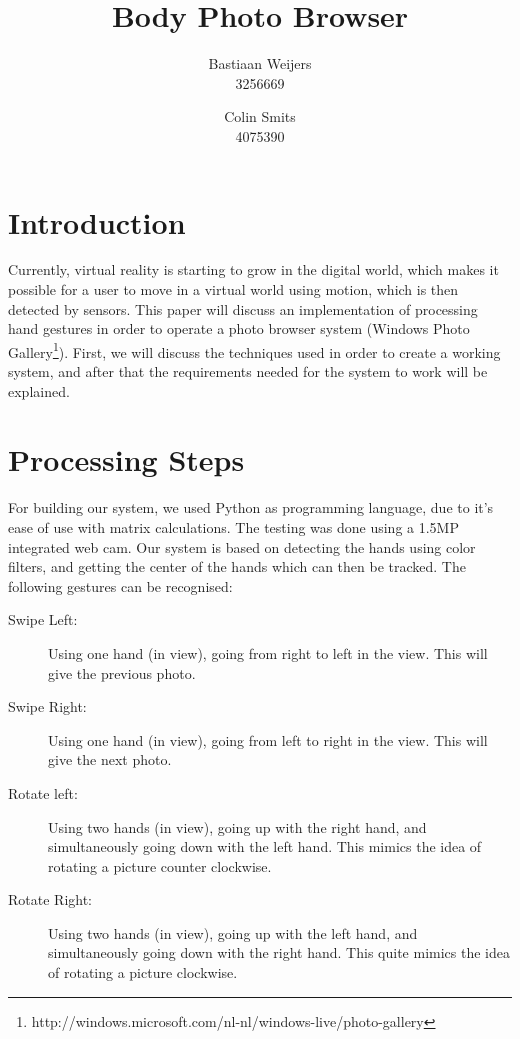 \documentclass[11pt,a4paper]{article}
\author{Bastiaan Weijers \\ 3256669 \and Colin Smits \\4075390}
\title{Body Photo Browser}
\begin{document}
\maketitle


\section{Introduction}
Currently, virtual reality is starting to grow in the digital world, which makes it possible for a user to move in a virtual world using motion, which is then detected by sensors. This paper will discuss an implementation of processing hand gestures in order to operate a photo browser system (Windows Photo Gallery\footnote{http://windows.microsoft.com/nl-nl/windows-live/photo-gallery}). First, we will discuss the techniques used in order to create a working system, and after that the requirements needed for the system to work will be explained.

\section{Processing Steps}
For building our system, we used Python as programming language, due to it's ease of use with matrix calculations. The testing was done using a 1.5MP integrated web cam. Our system is based on detecting the hands using color filters, and getting the center of the hands which can then be tracked. The following gestures can be recognised:

\begin{description}
\item[Swipe Left:] Using one hand (in view), going from right to left in the view. This will give the previous photo.
\item[Swipe Right:] Using one hand (in view), going from left to right in the view. This will give the next photo.
\item[Rotate left:] Using two hands (in view), going up with the right hand, and simultaneously going down with the left hand. This mimics the idea of rotating a picture counter clockwise.
\item[Rotate Right:] Using two hands (in view), going up with the left hand, and simultaneously going down with the right hand. This quite mimics the idea of rotating a picture clockwise.
\end{description}
\end{document}
